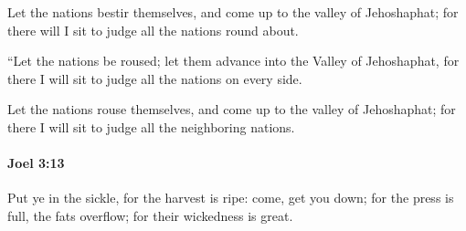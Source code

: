 			\begin{versebox}
					\item[BHS] 
					\item[LXX] 
					\item[ASV] Let the nations bestir themselves, and come up to the valley of Jehoshaphat; for there will I sit to judge all the nations round about.
					\item[NIV] “Let the nations be roused; let them advance into the Valley of Jehoshaphat, for there I will sit to judge all the nations on every side.
					\item[NRSV] Let the nations rouse themselves, and come up to the valley of Jehoshaphat; for there I will sit to judge all the neighboring nations.
			\end{versebox}

		\paragraph{Joel 3:13} %
			\label{JOEL-3-13}

			Put ye in the sickle, for the harvest is ripe: come, get you down; for the press is full, the fats overflow; for their wickedness is great.

